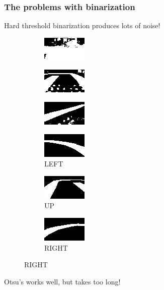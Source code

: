 \documentclass{beamer}
\begin{document}
\begin{frame}
  \frametitle{The problems with binarization}

  Hard threshold binarization produces lots of noise!

  \begin{figure}
    \begin{subfigure}{0.3\linewidth}
      \centering\includegraphics{imgs/binary_left_h.png}
      \captionsetup{justification=centering}
    \end{subfigure}
    \begin{subfigure}{0.3\linewidth}
      \centering\includegraphics{imgs/binary_up_h.png}
      \captionsetup{justification=centering}
    \end{subfigure}
    \begin{subfigure}{0.3\linewidth}
      \centering\includegraphics{imgs/binary_right_h.png}
      \captionsetup{justification=centering}
    \end{subfigure}
  \end{figure}

  \begin{figure}
    \begin{subfigure}{0.3\linewidth}
      \centering\includegraphics{imgs/binary_left.png}
      \captionsetup{justification=centering}
      \caption*{LEFT}
    \end{subfigure}
    \begin{subfigure}{0.3\linewidth}
      \centering\includegraphics{imgs/binary_up.png}
      \captionsetup{justification=centering}
      \caption*{UP}
    \end{subfigure}
    \begin{subfigure}{0.3\linewidth}
      \centering\includegraphics{imgs/binary_right.png}
      \captionsetup{justification=centering}
      \caption*{RIGHT}
    \end{subfigure}
  \end{figure}

  Otsu's works well, but takes too long!
\end{frame}
\end{document}
